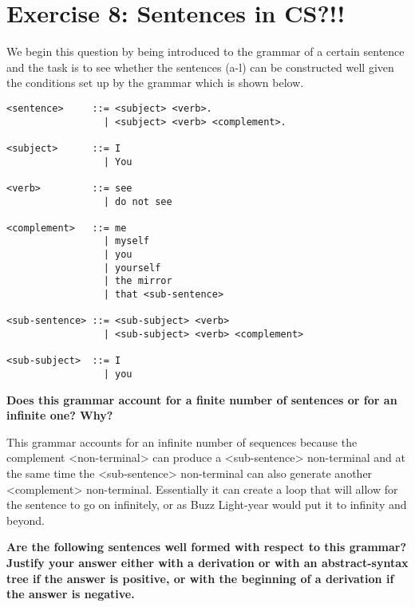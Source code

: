 \documentclass{article}
\begin{document}
\section{Exercise 8: Sentences in CS?!!}
We begin this question by being introduced to the grammar of a certain sentence and the task is to see whether the sentences (a-l) can be constructed well given the conditions set up by the grammar which is shown below. \linebreak
\begin{lstlisting}
<sentence>     ::= <subject> <verb>.
                 | <subject> <verb> <complement>.

<subject>      ::= I
                 | You

<verb>         ::= see
                 | do not see

<complement>   ::= me
                 | myself
                 | you
                 | yourself
                 | the mirror
                 | that <sub-sentence>

<sub-sentence> ::= <sub-subject> <verb>
                 | <sub-subject> <verb> <complement>

<sub-subject>  ::= I
                 | you
\end{lstlisting} 
\linebreak

\textbf{Does this grammar account for a finite number of sentences or for an infinite one? Why?}
\linebreak
 
This grammar accounts for an infinite number of sequences because the complement <non-terminal> can produce a <sub-sentence> non-terminal and at the same time the <sub-sentence> non-terminal can also generate another <complement> non-terminal. Essentially it can create a loop that will allow for the sentence to go on infinitely, or as Buzz Light-year would put it to infinity and beyond.\linebreak

\textbf{Are the following sentences well formed with respect to this grammar? Justify your answer either with a derivation or with an abstract-syntax tree if the answer is positive, or with the beginning of a derivation if the answer is negative.}
\linebreak
\end{document}
